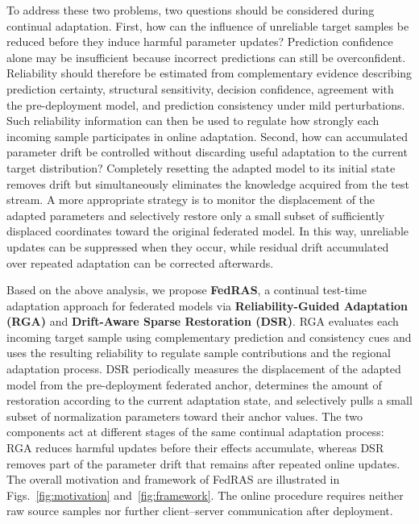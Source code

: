 \documentclass[journal]{IEEEtran}
\begin{document}
To address these two problems, two questions should be considered during continual adaptation. First, how can the influence of unreliable target samples be reduced before they induce harmful parameter updates? Prediction confidence alone may be insufficient because incorrect predictions can still be overconfident. Reliability should therefore be estimated from complementary evidence describing prediction certainty, structural sensitivity, decision confidence, agreement with the pre-deployment model, and prediction consistency under mild perturbations. Such reliability information can then be used to regulate how strongly each incoming sample participates in online adaptation. Second, how can accumulated parameter drift be controlled without discarding useful adaptation to the current target distribution? Completely resetting the adapted model to its initial state removes drift but simultaneously eliminates the knowledge acquired from the test stream. A more appropriate strategy is to monitor the displacement of the adapted parameters and selectively restore only a small subset of sufficiently displaced coordinates toward the original federated model. In this way, unreliable updates can be suppressed when they occur, while residual drift accumulated over repeated adaptation can be corrected afterwards.

Based on the above analysis, we propose \textbf{FedRAS}, a continual test-time adaptation approach for federated models via \textbf{Reliability-Guided Adaptation (RGA)} and \textbf{Drift-Aware Sparse Restoration (DSR)}. RGA evaluates each incoming target sample using complementary prediction and consistency cues and uses the resulting reliability to regulate sample contributions and the regional adaptation process. DSR periodically measures the displacement of the adapted model from the pre-deployment federated anchor, determines the amount of restoration according to the current adaptation state, and selectively pulls a small subset of normalization parameters toward their anchor values. The two components act at different stages of the same continual adaptation process: RGA reduces harmful updates before their effects accumulate, whereas DSR removes part of the parameter drift that remains after repeated online updates. The overall motivation and framework of FedRAS are illustrated in Figs.~\ref{fig:motivation} and~\ref{fig:framework}. The online procedure requires neither raw source samples nor further client--server communication after deployment.
\end{document}
